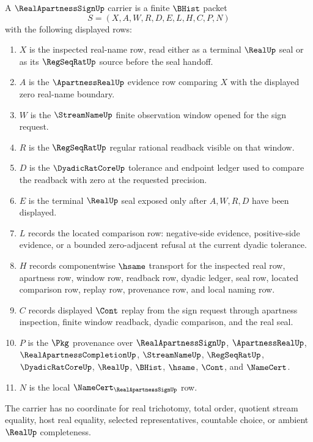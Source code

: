 \begin{definition}
\label{def:real-apartness-sign-carrier}
A $\RealApartnessSignUp$ carrier is a finite $\BHist$ packet
$$
S=(X,A,W,R,D,E,L,H,C,P,N)
$$
with the following displayed rows:
\begin{enumerate}
\item $X$ is the inspected real-name row, read either as a terminal $\RealUp$ seal or as its $\RegSeqRatUp$ source before the seal handoff.
\item $A$ is the $\ApartnessRealUp$ evidence row comparing $X$ with the displayed zero real-name boundary.
\item $W$ is the $\StreamNameUp$ finite observation window opened for the sign request.
\item $R$ is the $\RegSeqRatUp$ regular rational readback visible on that window.
\item $D$ is the $\DyadicRatCoreUp$ tolerance and endpoint ledger used to compare the readback with zero at the requested precision.
\item $E$ is the terminal $\RealUp$ seal exposed only after $A,W,R,D$ have been displayed.
\item $L$ records the located comparison row: negative-side evidence, positive-side evidence, or a bounded zero-adjacent refusal at the current dyadic tolerance.
\item $H$ records componentwise $\hsame$ transport for the inspected real row, apartness row, window row, readback row, dyadic ledger, seal row, located comparison row, replay row, provenance row, and local naming row.
\item $C$ records displayed $\Cont$ replay from the sign request through apartness inspection, finite window readback, dyadic comparison, and the real seal.
\item $P$ is the $\Pkg$ provenance over $\RealApartnessSignUp$, $\ApartnessRealUp$, $\RealApartnessCompletionUp$, $\StreamNameUp$, $\RegSeqRatUp$, $\DyadicRatCoreUp$, $\RealUp$, $\BHist$, $\hsame$, $\Cont$, and $\NameCert$.
\item $N$ is the local $\NameCert_{\RealApartnessSignUp}$ row.
\end{enumerate}
The carrier has no coordinate for real trichotomy, total order, quotient stream equality, host real equality, selected representatives, countable choice, or ambient $\RealUp$ completeness.
\end{definition}

